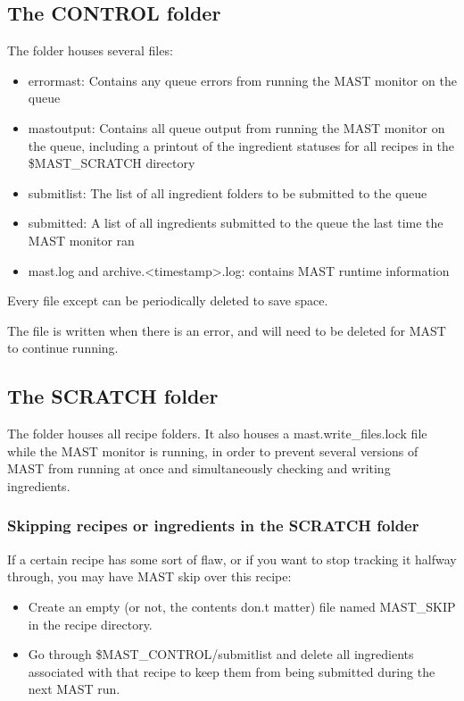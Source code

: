 \documentclass[letterpaper,10pt,english]{sphinxmanual}
\begin{document}
\subsection{The CONTROL folder}
\label{5_0_runningmast:the-control-folder}
The  folder houses several files:
\begin{itemize}
\item {} 
errormast: Contains any queue errors from running the MAST monitor on the queue

\item {} 
mastoutput: Contains all queue output from running the MAST monitor on the queue, including a printout of the ingredient statuses for all recipes in the \$MAST\_SCRATCH directory

\item {} 
submitlist: The list of all ingredient folders to be submitted to the queue

\item {} 
submitted: A list of all ingredients submitted to the queue the last time the MAST monitor ran

\item {} 
mast.log and archive.\textless{}timestamp\textgreater{}.log: contains MAST runtime information

\end{itemize}

Every file except  can be periodically deleted to save space.

The  file is written when there is an error, and will need to be deleted for MAST to continue running.


\subsection{The SCRATCH folder}
\label{5_0_runningmast:the-scratch-folder}
The  folder houses all recipe folders. It also houses a mast.write\_files.lock file while the MAST monitor is running, in order to prevent several versions of MAST from running at once and simultaneously checking and writing ingredients.


\subsubsection{Skipping recipes or ingredients in the SCRATCH folder}
\label{5_0_runningmast:skipping-recipes-or-ingredients-in-the-scratch-folder}
If a certain recipe has some sort of flaw, or if you want to stop tracking it halfway through, you may have MAST skip over this recipe:
\begin{itemize}
\item {} 
Create an empty (or not, the contents don.t matter) file named MAST\_SKIP in the recipe directory.

\item {} 
Go through \$MAST\_CONTROL/submitlist and delete all ingredients associated with that recipe to keep them from being submitted during the next MAST run.

\end{itemize}
\end{document}
